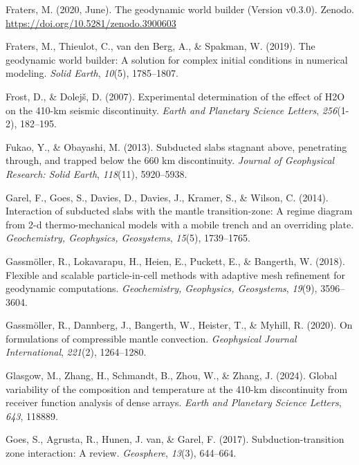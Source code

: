 \documentclass[draft,linenumbers]{agujournal2019}
\newlength{\cslhangindent}
\newenvironment{CSLReferences}[2]
 {\begin{list}{}{
  \setlength{\itemindent}{0pt}
  \setlength{\leftmargin}{0pt}
  \setlength{\parsep}{0pt}
  \ifodd #1
   \setlength{\leftmargin}{\cslhangindent}
   \setlength{\itemindent}{-\cslhangindent}
  \fi
  \setlength{\itemsep}{#2\baselineskip}
  }
  \item\relax}
 {\end{list}}
\begin{document}
\begin{CSLReferences}{1}{0}
Fraters, M. (2020, June). The geodynamic world builder (Version v0.3.0).
Zenodo. \url{https://doi.org/10.5281/zenodo.3900603}

{Fraters, M., Thieulot, C., van den Berg, A., \& Spakman, W.} (2019).
The geodynamic world builder: A solution for complex initial conditions
in numerical modeling. \emph{Solid Earth}, \emph{10}(5), 1785--1807.

Frost, D., \& Dolejš, D. (2007). Experimental determination of the
effect of H2O on the 410-km seismic discontinuity. \emph{Earth and
Planetary Science Letters}, \emph{256}(1-2), 182--195.

Fukao, Y., \& Obayashi, M. (2013). Subducted slabs stagnant above,
penetrating through, and trapped below the 660 km discontinuity.
\emph{Journal of Geophysical Research: Solid Earth}, \emph{118}(11),
5920--5938.

Garel, F., Goes, S., Davies, D., Davies, J., Kramer, S., \& Wilson, C.
(2014). Interaction of subducted slabs with the mantle transition-zone:
A regime diagram from 2-d thermo-mechanical models with a mobile trench
and an overriding plate. \emph{Geochemistry, Geophysics, Geosystems},
\emph{15}(5), 1739--1765.

Gassmöller, R., Lokavarapu, H., Heien, E., Puckett, E., \& Bangerth, W.
(2018). Flexible and scalable particle-in-cell methods with adaptive
mesh refinement for geodynamic computations. \emph{Geochemistry,
Geophysics, Geosystems}, \emph{19}(9), 3596--3604.

Gassmöller, R., Dannberg, J., Bangerth, W., Heister, T., \& Myhill, R.
(2020). On formulations of compressible mantle convection.
\emph{Geophysical Journal International}, \emph{221}(2), 1264--1280.

Glasgow, M., Zhang, H., Schmandt, B., Zhou, W., \& Zhang, J. (2024).
Global variability of the composition and temperature at the 410-km
discontinuity from receiver function analysis of dense arrays.
\emph{Earth and Planetary Science Letters}, \emph{643}, 118889.

Goes, S., Agrusta, R., Hunen, J. van, \& Garel, F. (2017).
Subduction-transition zone interaction: A review. \emph{Geosphere},
\emph{13}(3), 644--664.


\end{CSLReferences}
\end{document}
